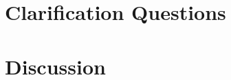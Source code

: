 \section{Clarification Questions}

\begin{QandA}
    \item \begin{questionitem} \begin{question}   \end{question}      
    \begin{answered}
        \textit{}
    \end{answered} \end{questionitem}
    
\end{QandA}

\section{Discussion}
\label{max_manhattan:sec:discussion}

